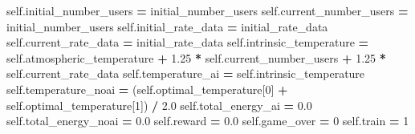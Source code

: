 \documentclass[
]{book}
\newenvironment{Shaded}{\begin{snugshade}}{\end{snugshade}}
\newcommand{\DecValTok}[1]{\textcolor[rgb]{0.00,0.00,0.81}{#1}}
\newcommand{\FloatTok}[1]{\textcolor[rgb]{0.00,0.00,0.81}{#1}}
\newcommand{\NormalTok}[1]{#1}
\newcommand{\OperatorTok}[1]{\textcolor[rgb]{0.81,0.36,0.00}{\textbf{#1}}}
\newcommand{\VariableTok}[1]{\textcolor[rgb]{0.00,0.00,0.00}{#1}}
\begin{document}
\begin{Shaded}
\begin{Highlighting}[]
        \VariableTok{self}\NormalTok{.initial\_number\_users }\OperatorTok{=}\NormalTok{ initial\_number\_users}
        \VariableTok{self}\NormalTok{.current\_number\_users }\OperatorTok{=}\NormalTok{ initial\_number\_users}
        \VariableTok{self}\NormalTok{.initial\_rate\_data }\OperatorTok{=}\NormalTok{ initial\_rate\_data}
        \VariableTok{self}\NormalTok{.current\_rate\_data }\OperatorTok{=}\NormalTok{ initial\_rate\_data}
        \VariableTok{self}\NormalTok{.intrinsic\_temperature }\OperatorTok{=} \VariableTok{self}\NormalTok{.atmospheric\_temperature}
                                     \OperatorTok{+} \FloatTok{1.25} \OperatorTok{*} \VariableTok{self}\NormalTok{.current\_number\_users}
                                     \OperatorTok{+} \FloatTok{1.25} \OperatorTok{*} \VariableTok{self}\NormalTok{.current\_rate\_data}
        \VariableTok{self}\NormalTok{.temperature\_ai }\OperatorTok{=} \VariableTok{self}\NormalTok{.intrinsic\_temperature}
        \VariableTok{self}\NormalTok{.temperature\_noai }\OperatorTok{=}\NormalTok{ (}\VariableTok{self}\NormalTok{.optimal\_temperature[}\DecValTok{0}\NormalTok{]}
                                \OperatorTok{+} \VariableTok{self}\NormalTok{.optimal\_temperature[}\DecValTok{1}\NormalTok{]) }\OperatorTok{/} \FloatTok{2.0}
        \VariableTok{self}\NormalTok{.total\_energy\_ai }\OperatorTok{=} \FloatTok{0.0}
        \VariableTok{self}\NormalTok{.total\_energy\_noai }\OperatorTok{=} \FloatTok{0.0}
        \VariableTok{self}\NormalTok{.reward }\OperatorTok{=} \FloatTok{0.0}
        \VariableTok{self}\NormalTok{.game\_over }\OperatorTok{=} \DecValTok{0}
        \VariableTok{self}\NormalTok{.train }\OperatorTok{=} \DecValTok{1}
\end{Highlighting}
\end{Shaded}
\end{document}
